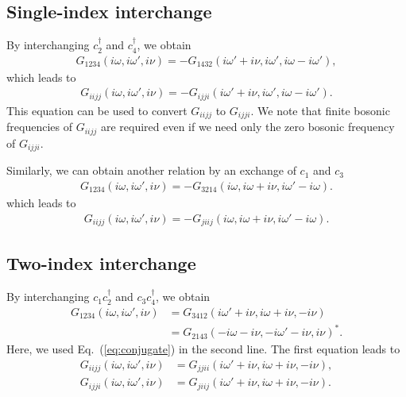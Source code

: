 \documentclass[disablejfam,12pt]{article}
\begin{document}
\subsection{Single-index interchange}
By interchanging $c_2^{\dag}$ and $c_4^{\dag}$, we obtain
\begin{align}
	G_{1234}(i \omega, i \omega', i\nu) = - G_{1432}(i \omega' + i\nu, i \omega', i\omega - i\omega'),
\end{align}
which leads to
\begin{align}
	G_{iijj}(i \omega, i \omega', i\nu) = - G_{ijji}(i \omega' + i\nu, i \omega', i\omega - i\omega').
\end{align}
This equation can be used to convert $G_{iijj}$ to $G_{ijji}$. We note that finite bosonic frequencies of $G_{iijj}$ are required even if we need only the zero bosonic frequency of $G_{ijji}$.

Similarly, we can obtain another relation by an exchange of $c_1$ and $c_3$
\begin{align}
	G_{1234}(i \omega, i \omega', i\nu) = - G_{3214}(i \omega, i \omega + i\nu, i\omega' - i\omega).
\end{align}
which leads to
\begin{align}
	G_{iijj}(i \omega, i \omega', i\nu) = - G_{jiij}(i \omega, i \omega + i\nu, i\omega' - i\omega).
\end{align}



\subsection{Two-index interchange}
By interchanging $c_1 c_2^{\dag}$ and $c_3 c_4^{\dag}$, we obtain
\begin{align}
	G_{1234}(i \omega, i \omega', i\nu) &= G_{3412}(i \omega' + i\nu, i \omega + i\nu, -i\nu) \\
	&= G_{2143}(-i \omega - i\nu, -i \omega' - i\nu, i\nu)^*.
\end{align}
Here, we used Eq.~(\ref{eq:conjugate}) in the second line.
The first equation leads to
\begin{align}
	G_{iijj}(i \omega, i \omega', i\nu) &= G_{jjii}(i \omega' + i\nu, i \omega + i\nu, -i\nu), \\
	G_{ijji}(i \omega, i \omega', i\nu) &= G_{jiij}(i \omega' + i\nu, i \omega + i\nu, -i\nu).
\end{align}
\end{document}
